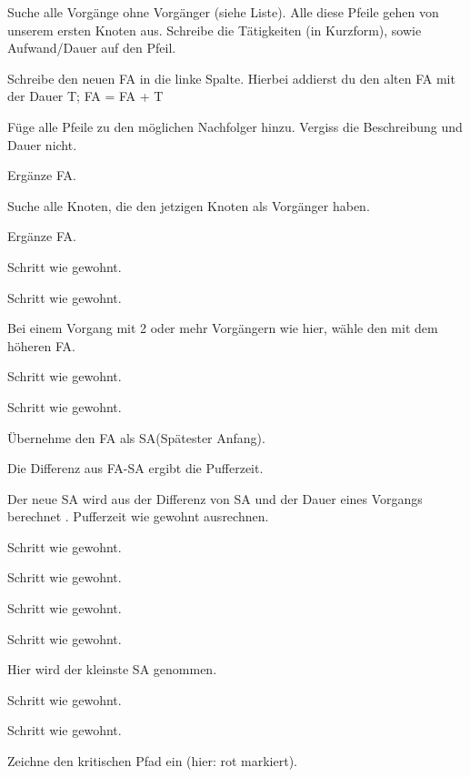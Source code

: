\documentclass{beamer}
\begin{document}
\begin{frame}[t,shrink=65]
\begin{columns}
\begin{itemize}
{    \item<only@+> {Suche alle Vorgänge ohne Vorgänger (siehe Liste). Alle diese Pfeile gehen von unserem ersten Knoten aus. Schreibe die Tätigkeiten (in Kurzform), sowie Aufwand/Dauer auf den Pfeil.}
    \item<only@+> {Schreibe den neuen FA in die linke Spalte. Hierbei addierst du den alten FA mit der Dauer T;
                   FA = FA + T}
    \item<only@+> {Füge alle Pfeile zu den möglichen Nachfolger hinzu. Vergiss die Beschreibung und Dauer nicht.}
    \item<only@+> {Ergänze FA.}
    \item<only@+> {Suche alle Knoten, die den jetzigen Knoten als Vorgänger haben.}
    \item<only@+> {Ergänze FA.}
    \item<only@+> {Schritt wie gewohnt.}
    \item<only@+> {Schritt wie gewohnt.}
    \item<only@+> {Bei einem Vorgang mit 2 oder mehr Vorgängern wie hier, wähle den mit dem höheren FA.}
    \item<only@+> {Schritt wie gewohnt.}
    \item<only@+> {Schritt wie gewohnt.}
    \item<only@+> {Übernehme den FA als SA(Spätester Anfang).}
    \item<only@+> {Die Differenz aus FA-SA ergibt die Pufferzeit.}
    \item<only@+> {Der neue SA wird aus der Differenz von SA und der Dauer eines Vorgangs berechnet . Pufferzeit wie gewohnt ausrechnen.}
    \item<only@+> {Schritt wie gewohnt.}
    \item<only@+> {Schritt wie gewohnt.}
    \item<only@+> {Schritt wie gewohnt.}
    \item<only@+> {Schritt wie gewohnt.}
    \item<only@+> {Hier wird der kleinste SA genommen.}
    \item<only@+> {Schritt wie gewohnt.}
    \item<only@+> {Schritt wie gewohnt.}
    \item<only@+> {Zeichne den kritischen Pfad ein (hier: rot markiert).}
    \item \alert<+> {}
}

\end{itemize}


\end{columns}
\end{frame}
\end{document}
